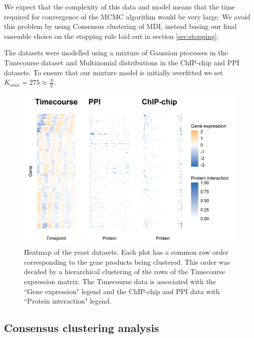 \documentclass[]{article}
\begin{document}
We expect that the complexity of this data and model means that the time required for convergence of the MCMC algorithm would be very large. We avoid this problem by using Consensus clustering of MDI, instead basing our final ensemble choice on the stopping rule laid out in section \ref{sec:stopping}.

The datasets were modelled using a mixture of Gaussian processes in the Timecourse dataset and Multinomial distributions in the ChIP-chip and PPI datasets. To ensure that our mixture model is initially overfitted we set $K_{max}=275\approx\frac{N}{2}$.

\begin{figure}
	\centering
	\includegraphics[scale=0.7]{./Images/Yeast/yeastData.png}
	\caption{Heatmap of the yeast datasets. Each plot has a common row order corresponding to the gene products being clustered. This order was decided by a hierarchical clustering of the rows of the Timecourse expression matrix. The Timecourse data is associated with the ``Gene expression" legend and the ChIP-chip and PPI data with ``Protein interaction" legend.}
	\label{fig:yeastData}
\end{figure}

\subsection{Consensus clustering analysis} \label{sec:consensusClustering}

\end{document}
